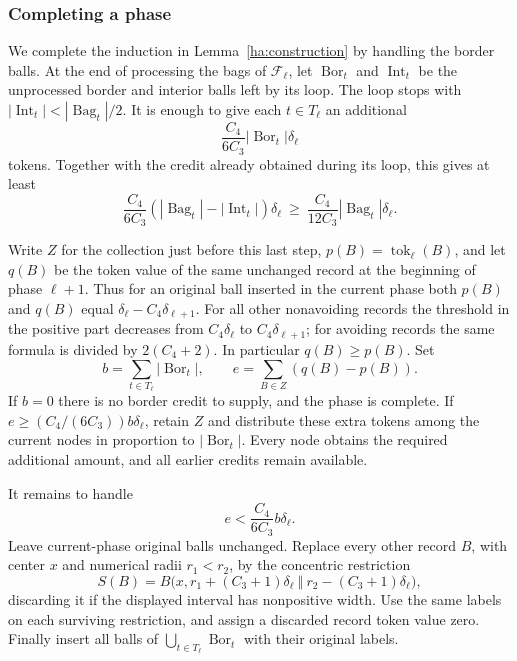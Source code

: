 \subsubsection{Completing a phase}
\label{ha:postprocess}

We complete the induction in Lemma~\ref{ha:construction} by handling
the border balls.  At the end of processing the bags of
$\mathcal F_\ell$, let $\operatorname{Bor}_t$ and
$\operatorname{Int}_t$ be the unprocessed border and interior balls
left by its loop.  The loop stops with
$|\operatorname{Int}_t|<|\operatorname{Bag}_t|/2$.
It is enough to give each $t\in T_\ell$ an additional
\[
 \frac{C_4}{6C_3}|\operatorname{Bor}_t|\delta_\ell
\]
tokens.  Together with the credit already obtained during its loop,
this gives at least
\begin{equation}\label{ha:phase-target}
 \frac{C_4}{6C_3}
 (|\operatorname{Bag}_t|-|\operatorname{Int}_t|)\delta_\ell
 \ \ge\ \frac{C_4}{12C_3}|\operatorname{Bag}_t|\delta_\ell.
\end{equation}

Write $Z$ for the collection just before this last step,
$p(B)=\operatorname{tok}_\ell(B)$, and let $q(B)$ be the token
value of the same unchanged record at the beginning of phase
$\ell+1$.  Thus for an original ball inserted in the current phase
both $p(B)$ and $q(B)$ equal $\delta_\ell-C_4\delta_{\ell+1}$.
For all other nonavoiding records the threshold in the positive
part decreases from $C_4\delta_\ell$ to $C_4\delta_{\ell+1}$;
for avoiding records the same formula is divided by $2(C_4+2)$.
In particular $q(B)\ge p(B)$.
Set
\[
 b=\sum_{t\in T_\ell}|\operatorname{Bor}_t|,
 \qquad e=\sum_{B\in Z}(q(B)-p(B)).
\]
If $b=0$ there is no border credit to supply, and the phase is
complete.  If $e\ge (C_4/(6C_3))b\delta_\ell$, retain $Z$ and
distribute these extra tokens among the current nodes in proportion
to $|\operatorname{Bor}_t|$.  Every node obtains the required
additional amount, and all earlier credits remain available.

It remains to handle
\begin{equation}\label{ha:small-excess}
 e<\frac{C_4}{6C_3}b\delta_\ell.
\end{equation}
Leave current-phase original balls unchanged.  Replace every other
record $B$, with center $x$ and numerical radii $r_1<r_2$, by the
concentric restriction
\[
 S(B)=B\bigl(x,r_1+(C_3+1)\delta_\ell\ \Vert\
                    r_2-(C_3+1)\delta_\ell\bigr),
\]
discarding it if the displayed interval has nonpositive width.
Use the same labels on each surviving restriction, and assign a
discarded record token value zero.  Finally insert all balls of
$\bigcup_{t\in T_\ell}\operatorname{Bor}_t$ with their original
labels.

